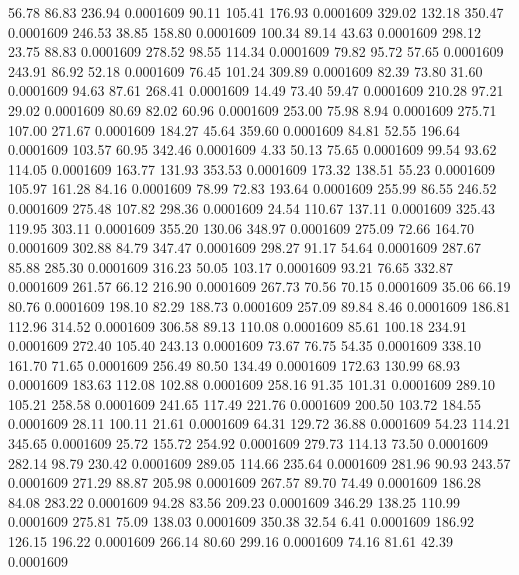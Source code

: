   56.78   86.83  236.94   0.0001609
  90.11  105.41  176.93   0.0001609
 329.02  132.18  350.47   0.0001609
 246.53   38.85  158.80   0.0001609
 100.34   89.14   43.63   0.0001609
 298.12   23.75   88.83   0.0001609
 278.52   98.55  114.34   0.0001609
  79.82   95.72   57.65   0.0001609
 243.91   86.92   52.18   0.0001609
  76.45  101.24  309.89   0.0001609
  82.39   73.80   31.60   0.0001609
  94.63   87.61  268.41   0.0001609
  14.49   73.40   59.47   0.0001609
 210.28   97.21   29.02   0.0001609
  80.69   82.02   60.96   0.0001609
 253.00   75.98    8.94   0.0001609
 275.71  107.00  271.67   0.0001609
 184.27   45.64  359.60   0.0001609
  84.81   52.55  196.64   0.0001609
 103.57   60.95  342.46   0.0001609
   4.33   50.13   75.65   0.0001609
  99.54   93.62  114.05   0.0001609
 163.77  131.93  353.53   0.0001609
 173.32  138.51   55.23   0.0001609
 105.97  161.28   84.16   0.0001609
  78.99   72.83  193.64   0.0001609
 255.99   86.55  246.52   0.0001609
 275.48  107.82  298.36   0.0001609
  24.54  110.67  137.11   0.0001609
 325.43  119.95  303.11   0.0001609
 355.20  130.06  348.97   0.0001609
 275.09   72.66  164.70   0.0001609
 302.88   84.79  347.47   0.0001609
 298.27   91.17   54.64   0.0001609
 287.67   85.88  285.30   0.0001609
 316.23   50.05  103.17   0.0001609
  93.21   76.65  332.87   0.0001609
 261.57   66.12  216.90   0.0001609
 267.73   70.56   70.15   0.0001609
  35.06   66.19   80.76   0.0001609
 198.10   82.29  188.73   0.0001609
 257.09   89.84    8.46   0.0001609
 186.81  112.96  314.52   0.0001609
 306.58   89.13  110.08   0.0001609
  85.61  100.18  234.91   0.0001609
 272.40  105.40  243.13   0.0001609
  73.67   76.75   54.35   0.0001609
 338.10  161.70   71.65   0.0001609
 256.49   80.50  134.49   0.0001609
 172.63  130.99   68.93   0.0001609
 183.63  112.08  102.88   0.0001609
 258.16   91.35  101.31   0.0001609
 289.10  105.21  258.58   0.0001609
 241.65  117.49  221.76   0.0001609
 200.50  103.72  184.55   0.0001609
  28.11  100.11   21.61   0.0001609
  64.31  129.72   36.88   0.0001609
  54.23  114.21  345.65   0.0001609
  25.72  155.72  254.92   0.0001609
 279.73  114.13   73.50   0.0001609
 282.14   98.79  230.42   0.0001609
 289.05  114.66  235.64   0.0001609
 281.96   90.93  243.57   0.0001609
 271.29   88.87  205.98   0.0001609
 267.57   89.70   74.49   0.0001609
 186.28   84.08  283.22   0.0001609
  94.28   83.56  209.23   0.0001609
 346.29  138.25  110.99   0.0001609
 275.81   75.09  138.03   0.0001609
 350.38   32.54    6.41   0.0001609
 186.92  126.15  196.22   0.0001609
 266.14   80.60  299.16   0.0001609
  74.16   81.61   42.39   0.0001609
